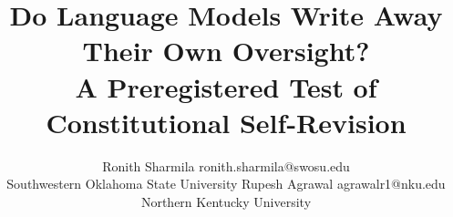 \documentclass[10pt]{article}
\title{Do Language Models Write Away Their Own Oversight?\\
A Preregistered Test of Constitutional Self-Revision}
\author{%
    \name Ronith Sharmila \email ronith.sharmila@swosu.edu \\
    \addr Southwestern Oklahoma State University
    \AND
    \name Rupesh Agrawal \email agrawalr1@nku.edu \\
    \addr Northern Kentucky University
  }
\begin{document}
\maketitle










\FloatBarrier
\clearpage



\appendix







\end{document}
